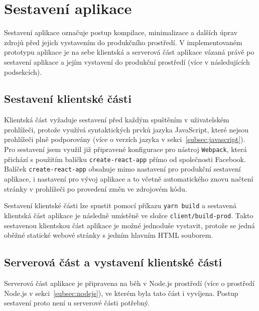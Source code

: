 
\section{Sestavení aplikace}\label{sec:sestaveníAplikace}

Sestavení aplikace označuje postup kompilace, minimalizace a dalších úprav zdrojů před jejich vystavením do produkčního prostředí.
V implementovaném prototypu aplikace je na sebe klientská a serverová část aplikace vázaná právě po sestavení aplikace a jejím vystavení do produkční prostředí (více v následujících podsekcích).

\subsection{Sestavení klientské části}\label{subsec:sestaveníKlientskéČásti}

Klientská část vyžaduje sestavení před každým spuštěním v uživatelském prohlížeči, protože využívá syntaktických prvků jazyka JavaScript, které nejsou prohlížeči plně podporovány (více o verzích jazyka v sekci~\ref{subsec:javascript}).
Pro sestavení jsem využil již připravené konfigurace pro nástroj \texttt{Webpack}, která přichází s použitím balíčku \texttt{create-react-app} přímo od společnosti Facebook.
Balíček \texttt{create-react-app} obsahuje mimo nastavení pro produkční sestavení aplikace, i nastavení pro vývoj aplikace a to včetně automatického znovu načtení stránky v prohlížeči po provedení změn ve zdrojovém kódu.

Sestavení klientské části lze spustit pomocí příkazu \texttt{yarn build} a sestavená klientská část aplikace je následně umístěně ve složce \texttt{client/build-prod}.
Takto sestavenou klientskou část aplikace je možné jednoduše vystavit, protože se jedná oběžné statické webové stránky s jedním hlavním \gls{HTML} souborem.

\subsection{Serverová část a vystavení klientské části}\label{subsec:serverováČástAVystaveníKlientskéČásti}

Serverová část aplikace je připravena na běh v Node.js prostředí (více o prostředí Node.js v sekci~\ref{subsec:nodejs}), ve kterém byla tato část i vyvíjena.
Postup sestavení proto není u serverové části potřebný.

